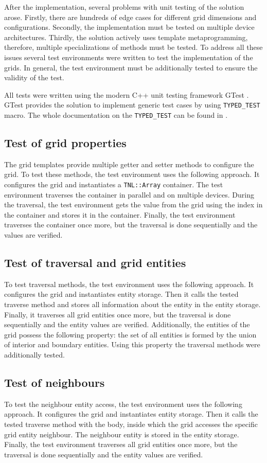 After the implementation, several problems with unit testing of the solution arose.
Firstly, there are hundreds of edge cases for different grid dimensions and configurations.
Secondly, the implementation must be tested on multiple device architectures.
Thirdly, the solution actively uses template metaprogramming, therefore, multiple specializations of methods must be tested.
To address all these issues several test environments were written to test the implementation of the grids.
In general, the test environment must be additionally tested to ensure the validity of the test.

All tests were written using the modern C++ unit testing framework GTest \cite{GTest}.
GTest provides the solution to implement generic test cases by using \texttt{TYPED\_TEST} macro.
The whole documentation on the \texttt{TYPED\_TEST} can be found in \cite{GTest}.

\subsection{Test of grid properties}

The grid templates provide multiple getter and setter methods to configure the grid.
To test these methods, the test environment uses the following approach.
It configures the grid and instantiates a \texttt{TNL::Array} container.
The test environment traverses the container in parallel and on multiple devices.
During the traversal, the test environment gets the value from the grid using the index in the container and stores it in the container.
Finally, the test environment traverses the container once more, but the traversal is done sequentially and the values are verified.

\subsection{Test of traversal and grid entities}

To test traversal methods, the test environment uses the following approach.
It configures the grid and instantiates entity storage.
Then it calls the tested traverse method and stores all information about the entity in the entity storage.
Finally, it traverses all grid entities once more, but the traversal is done sequentially and the entity values are verified.
Additionally, the entities of the grid possess the following property: the set of all entities is formed by the union of interior and boundary entities.
Using this property the traversal methods were additionally tested.

\subsection{Test of neighbours}

To test the neighbour entity access, the test environment uses the following approach.
It configures the grid and instantiates entity storage.
Then it calls the tested traverse method with the body, inside which the grid accesses the specific grid entity neighbour.
The neighbour entity is stored in the entity storage.
Finally, the test environment traverses all grid entities once more, but the traversal is done sequentially and the entity values are verified.